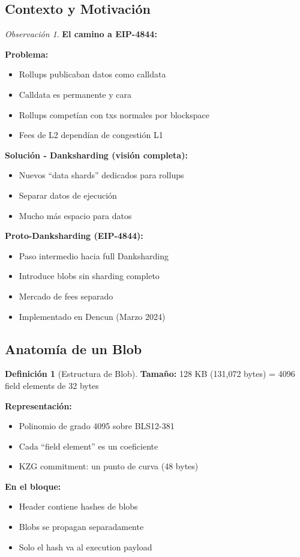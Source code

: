 \documentclass[11pt,a4paper,twoside,openright]{book}
\theoremstyle{definition}
\newtheorem{definition}{Definición}[chapter]
\theoremstyle{plain}
\theoremstyle{remark}
\newtheorem{remark}{Observación}[chapter]
\begin{document}
\subsection{Contexto y Motivación}

\begin{remark}
\textbf{El camino a EIP-4844:}

\textbf{Problema:}
\begin{itemize}
    \item Rollups publicaban datos como calldata
    \item Calldata es permanente y cara
    \item Rollups competían con txs normales por blockspace
    \item Fees de L2 dependían de congestión L1
\end{itemize}

\textbf{Solución - Danksharding (visión completa):}
\begin{itemize}
    \item Nuevos ``data shards'' dedicados para rollups
    \item Separar datos de ejecución
    \item Mucho más espacio para datos
\end{itemize}

\textbf{Proto-Danksharding (EIP-4844):}
\begin{itemize}
    \item Paso intermedio hacia full Danksharding
    \item Introduce blobs sin sharding completo
    \item Mercado de fees separado
    \item Implementado en Dencun (Marzo 2024)
\end{itemize}
\end{remark}

\subsection{Anatomía de un Blob}

\begin{definition}[Estructura de Blob]
\textbf{Tamaño:} 128 KB (131,072 bytes) = 4096 field elements de 32 bytes

\textbf{Representación:}
\begin{itemize}
    \item Polinomio de grado 4095 sobre BLS12-381
    \item Cada ``field element'' es un coeficiente
    \item KZG commitment: un punto de curva (48 bytes)
\end{itemize}

\textbf{En el bloque:}
\begin{itemize}
    \item Header contiene hashes de blobs
    \item Blobs se propagan separadamente
    \item Solo el hash va al execution payload
\end{itemize}
\end{definition}
\end{document}
